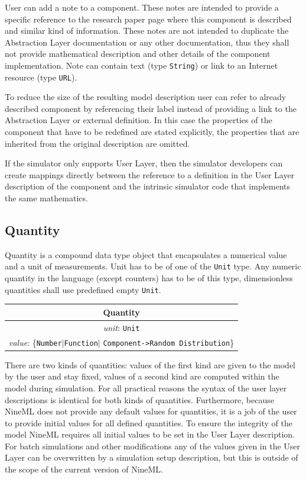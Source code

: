 \documentclass[draftspec]{ninemlspec}
\begin{document}
User can add a note to a component. These notes are intended to provide
a specific reference to the research paper page where this component is
described and similar kind of information. These notes are not intended
to duplicate the Abstraction Layer documentation or any other
documentation, thus they shall not provide mathematical description and
other details of the component implementation. Note can contain text
(type {\tt String}) or link to an Internet resource (type {\tt URL}).

To reduce the size of the resulting model description user can refer to
already described component by referencing their label instead of providing
a link to the Abstraction Layer or external definition. In this case the
properties of the component that have to be redefined are stated explicitly,
the properties that are inherited from the original description are omitted.

If the simulator only supports User Layer, then the simulator developers
can create mappings directly between the reference to a definition in the
User Layer description of the component and the intrinsic simulator code
that implements the same mathematics.

\subsection{Quantity}
\label{quantity}

Quantity is a compound data type object that encapsulates a numerical value
and a unit of measurements. Unit has to be of one of the {\tt Unit} type.
Any numeric quantity in the language (except counters) has to be of this type,
dimensionless quantities shall use predefined empty {\tt Unit}.

\begin{table}[htb]
\center
\begin{tabular}{|c|}
\hline
\hline
Quantity \\
\hline
\hline
{\em unit}: {\tt Unit} \\
\hline
{\em value}: \{{\tt Number}$|${\tt Function}$|$%
{\tt Component->Random Distribution}\} \\
\hline
\end{tabular}
\end{table}

There are two kinds of quantities: values of the first kind are given to the
model by the user and stay fixed, values of a second kind are computed within
the model during simulation. For all practical reasons the syntax of the user
layer descriptions is identical for both kinds of quantities. Furthermore,
because NineML does not provide any default values for quantities, it is a
job of the user to provide initial values for all defined quantities. To
ensure the integrity of the model NineML requires all initial values to be
set in the User Layer description. For batch simulations and other
modifications any of the values given in the User Layer can be overwritten
by a simulation setup description, but this is outside of the scope of the
current version of NineML.
\end{document}
